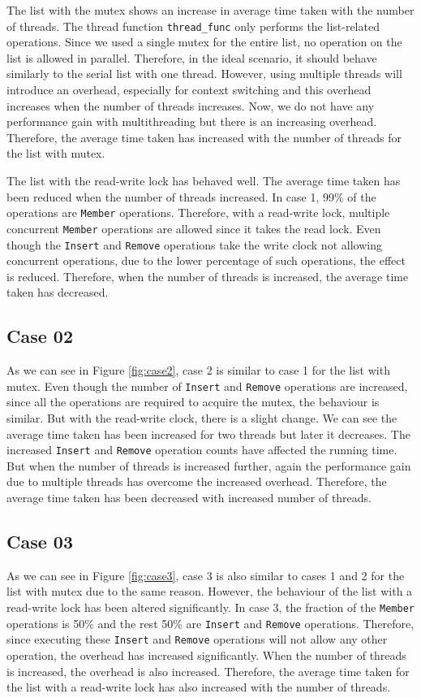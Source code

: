 \documentclass[a4paper,12pt]{article}
\begin{document}
The list with the mutex shows an increase in average time taken with the number of threads. The thread function \lstinline|thread_func| only performs the list-related operations. Since we used a single mutex for the entire list, no operation on the list is allowed in parallel. Therefore, in the ideal scenario, it should behave similarly to the serial list with one thread. However, using multiple threads will introduce an overhead, especially for context switching and this overhead increases when the number of threads increases. Now, we do not have any performance gain with multithreading but there is an increasing overhead. Therefore, the average time taken has increased with the number of threads for the list with mutex.

The list with the read-write lock has behaved well. The average time taken has been reduced when the number of threads increased. In case 1, 99\% of the operations are \lstinline|Member| operations. Therefore, with a read-write lock, multiple concurrent \lstinline|Member| operations are allowed since it takes the read lock. Even though the \lstinline|Insert| and \lstinline|Remove| operations take the write clock not allowing concurrent operations, due to the lower percentage of such operations, the effect is reduced. Therefore, when the number of threads is increased, the average time taken has decreased.

\subsection{Case 02}

As we can see in Figure \ref{fig:case2}, case 2 is similar to case 1 for the list with mutex. Even though the number of  \lstinline|Insert| and \lstinline|Remove| operations are increased, since all the operations are required to acquire the mutex, the behaviour is similar. But with the read-write clock, there is a slight change. We can see the average time taken has been increased for two threads but later it decreases. The increased \lstinline|Insert| and \lstinline|Remove| operation counts have affected the running time. But when the number of threads is increased further, again the performance gain due to multiple threads has overcome the increased overhead. Therefore, the average time taken has been decreased with increased number of threads.

\subsection{Case 03}

As we can see in Figure \ref{fig:case3}, case 3 is also similar to cases 1 and 2 for the list with mutex due to the same reason. However, the behaviour of the list with a read-write lock has been altered significantly. In case 3, the fraction of the \lstinline|Member| operations is 50\% and the rest 50\% are  \lstinline|Insert| and \lstinline|Remove| operations. Therefore, since executing these \lstinline|Insert| and \lstinline|Remove| operations will not allow any other operation, the overhead has increased significantly. When the number of threads is increased, the overhead is also increased. Therefore, the average time taken for the list with a read-write lock has also increased with the number of threads.
\end{document}

